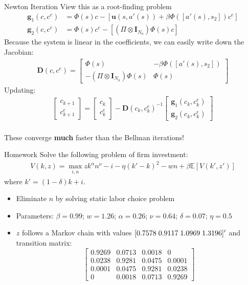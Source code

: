 \documentclass{beamer}
\begin{document}
\begin{frame}{Newton Iteration}
View this as a root-finding problem
\begin{align*}
\mathbf{g}_1(c, c^e) &= \Phi(s) c - \left[\mathbf{u}(s, a'(s)) + \beta \Phi([a'(s), s_2]) c^e \right] \\
\mathbf{g}_2(c, c^e) &= \Phi(s) c^e - \left[ (\Pi \otimes \mathbf{I}_{N_a}) \Phi (s) c \right]
\end{align*}
Because the system is linear in the coefficients, we can easily write down the Jacobian:
\begin{align*}
\mathbf{D}(c, c^e) =
\begin{bmatrix}
\Phi(s) & -\beta \Phi([a'(s), s_2]) \\
-(\Pi \otimes \mathbf{I}_{N_a}) \Phi (s) & \Phi(s)
\end{bmatrix}
\end{align*}
Updating:
\begin{align*}
\begin{bmatrix}
c_{k+1} \\
c^e_{k+1}
\end{bmatrix}
=
\begin{bmatrix}
c_{k} \\
c^e_{k}
\end{bmatrix}
- \mathbf{D}(c_k, c_k^e)^{-1}
\begin{bmatrix}
\mathbf{g}_1(c_k, c^e_k) \\
\mathbf{g}_2(c_k, c^e_k)
\end{bmatrix}
\end{align*} \\
\vspace{2mm}
These converge \textbf{much} faster than the Bellman iterations!
\end{frame}

\begin{frame}{Homework}
Solve the following problem of firm investment:
\begin{align*}
V(k, z) = \max_{i, n} z k^{\alpha} n^{\nu} - i - \eta (k' - k)^2 - wn + \beta \mathbb{E} \left[V(k', z') \right]
\end{align*}
where $k' = (1 - \delta)k + i$.
\begin{itemize}
\item Eliminate $n$ by solving static labor choice problem
\item Parameters: $\beta = 0.99$; $w = 1.26$; $\alpha = 0.26$; $\nu = 0.64$; $\delta = 0.07$; $\eta = 0.5$
\item $z$ follows a Markov chain with values $[0.7578 \hspace{1mm} 0.9117 \hspace{1mm} 1.0969 \hspace{1mm} 1.3196]'$ and transition matrix:
\vspace{1mm}
$$\begin{bmatrix}
 0.9269  &   0.0713  & 0.0018 & 0 \\
 0.0238  &   0.9281  & 0.0475 & 0.0001 \\
 0.0001  &   0.0475  & 0.9281 & 0.0238 \\
 0       &   0.0018  & 0.0713 & 0.9269
\end{bmatrix}$$
\end{itemize}
\end{frame}
\end{document}
